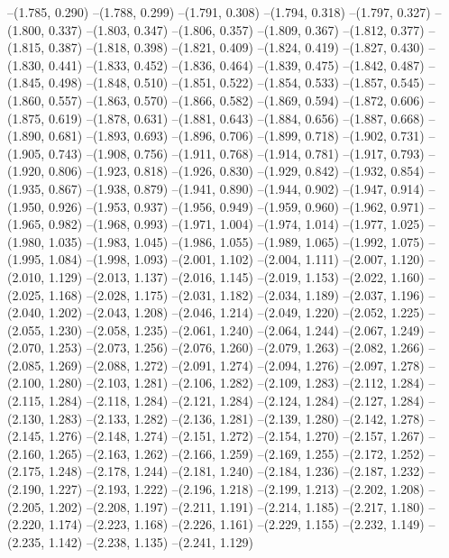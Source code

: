 {--(1.785, 0.290)
--(1.788, 0.299)
--(1.791, 0.308)
--(1.794, 0.318)
--(1.797, 0.327)
--(1.800, 0.337)
--(1.803, 0.347)
--(1.806, 0.357)
--(1.809, 0.367)
--(1.812, 0.377)
--(1.815, 0.387)
--(1.818, 0.398)
--(1.821, 0.409)
--(1.824, 0.419)
--(1.827, 0.430)
--(1.830, 0.441)
--(1.833, 0.452)
--(1.836, 0.464)
--(1.839, 0.475)
--(1.842, 0.487)
--(1.845, 0.498)
--(1.848, 0.510)
--(1.851, 0.522)
--(1.854, 0.533)
--(1.857, 0.545)
--(1.860, 0.557)
--(1.863, 0.570)
--(1.866, 0.582)
--(1.869, 0.594)
--(1.872, 0.606)
--(1.875, 0.619)
--(1.878, 0.631)
--(1.881, 0.643)
--(1.884, 0.656)
--(1.887, 0.668)
--(1.890, 0.681)
--(1.893, 0.693)
--(1.896, 0.706)
--(1.899, 0.718)
--(1.902, 0.731)
--(1.905, 0.743)
--(1.908, 0.756)
--(1.911, 0.768)
--(1.914, 0.781)
--(1.917, 0.793)
--(1.920, 0.806)
--(1.923, 0.818)
--(1.926, 0.830)
--(1.929, 0.842)
--(1.932, 0.854)
--(1.935, 0.867)
--(1.938, 0.879)
--(1.941, 0.890)
--(1.944, 0.902)
--(1.947, 0.914)
--(1.950, 0.926)
--(1.953, 0.937)
--(1.956, 0.949)
--(1.959, 0.960)
--(1.962, 0.971)
--(1.965, 0.982)
--(1.968, 0.993)
--(1.971, 1.004)
--(1.974, 1.014)
--(1.977, 1.025)
--(1.980, 1.035)
--(1.983, 1.045)
--(1.986, 1.055)
--(1.989, 1.065)
--(1.992, 1.075)
--(1.995, 1.084)
--(1.998, 1.093)
--(2.001, 1.102)
--(2.004, 1.111)
--(2.007, 1.120)
--(2.010, 1.129)
--(2.013, 1.137)
--(2.016, 1.145)
--(2.019, 1.153)
--(2.022, 1.160)
--(2.025, 1.168)
--(2.028, 1.175)
--(2.031, 1.182)
--(2.034, 1.189)
--(2.037, 1.196)
--(2.040, 1.202)
--(2.043, 1.208)
--(2.046, 1.214)
--(2.049, 1.220)
--(2.052, 1.225)
--(2.055, 1.230)
--(2.058, 1.235)
--(2.061, 1.240)
--(2.064, 1.244)
--(2.067, 1.249)
--(2.070, 1.253)
--(2.073, 1.256)
--(2.076, 1.260)
--(2.079, 1.263)
--(2.082, 1.266)
--(2.085, 1.269)
--(2.088, 1.272)
--(2.091, 1.274)
--(2.094, 1.276)
--(2.097, 1.278)
--(2.100, 1.280)
--(2.103, 1.281)
--(2.106, 1.282)
--(2.109, 1.283)
--(2.112, 1.284)
--(2.115, 1.284)
--(2.118, 1.284)
--(2.121, 1.284)
--(2.124, 1.284)
--(2.127, 1.284)
--(2.130, 1.283)
--(2.133, 1.282)
--(2.136, 1.281)
--(2.139, 1.280)
--(2.142, 1.278)
--(2.145, 1.276)
--(2.148, 1.274)
--(2.151, 1.272)
--(2.154, 1.270)
--(2.157, 1.267)
--(2.160, 1.265)
--(2.163, 1.262)
--(2.166, 1.259)
--(2.169, 1.255)
--(2.172, 1.252)
--(2.175, 1.248)
--(2.178, 1.244)
--(2.181, 1.240)
--(2.184, 1.236)
--(2.187, 1.232)
--(2.190, 1.227)
--(2.193, 1.222)
--(2.196, 1.218)
--(2.199, 1.213)
--(2.202, 1.208)
--(2.205, 1.202)
--(2.208, 1.197)
--(2.211, 1.191)
--(2.214, 1.185)
--(2.217, 1.180)
--(2.220, 1.174)
--(2.223, 1.168)
--(2.226, 1.161)
--(2.229, 1.155)
--(2.232, 1.149)
--(2.235, 1.142)
--(2.238, 1.135)
--(2.241, 1.129)
}
